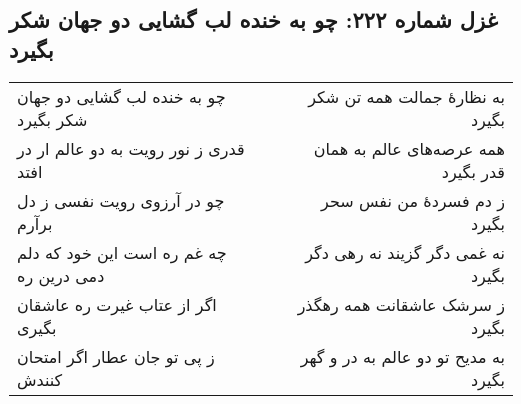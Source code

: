 \begin{center}
\section*{غزل شماره ۲۲۲: چو به خنده لب گشایی دو جهان شکر بگیرد}
\label{sec:222}
\begin{longtable}{l p{0.5cm} r}
چو به خنده لب گشایی دو جهان شکر بگیرد
&&
به نظارهٔ جمالت همه تن شکر بگیرد
\\
قدری ز نور رویت به دو عالم ار در افتد
&&
همه عرصه‌های عالم به همان قدر بگیرد
\\
چو در آرزوی رویت نفسی ز دل برآرم
&&
ز دم فسردهٔ من نفس سحر بگیرد
\\
چه غم ره است این خود که دلم دمی درین ره
&&
نه غمی دگر گزیند نه رهی دگر بگیرد
\\
اگر از عتاب غیرت ره عاشقان بگیری
&&
ز سرشک عاشقانت همه رهگذر بگیرد
\\
ز پی تو جان عطار اگر امتحان کنندش
&&
به مدیح تو دو عالم به در و گهر بگیرد
\\
\end{longtable}
\end{center}
